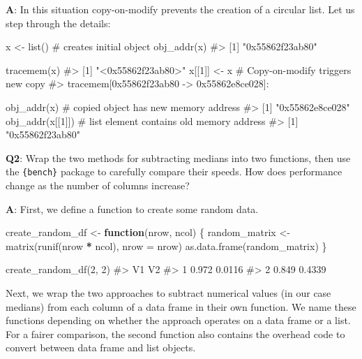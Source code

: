 \documentclass[
]{krantz}
\makeatletter
\newenvironment{Shaded}{\begin{snugshade}}{\end{snugshade}}
\newcommand{\CommentTok}[1]{\textcolor[rgb]{0.56,0.35,0.01}{\textit{#1}}}
\newcommand{\ControlFlowTok}[1]{\textcolor[rgb]{0.13,0.29,0.53}{\textbf{#1}}}
\newcommand{\DataTypeTok}[1]{\textcolor[rgb]{0.13,0.29,0.53}{#1}}
\newcommand{\DecValTok}[1]{\textcolor[rgb]{0.00,0.00,0.81}{#1}}
\newcommand{\KeywordTok}[1]{\textcolor[rgb]{0.13,0.29,0.53}{\textbf{#1}}}
\newcommand{\NormalTok}[1]{#1}
\newcommand{\OperatorTok}[1]{\textcolor[rgb]{0.81,0.36,0.00}{\textbf{#1}}}
\newcommand{\StringTok}[1]{\textcolor[rgb]{0.31,0.60,0.02}{#1}}
\newenvironment{kframe}{%
\medskip{}
\setlength{\fboxsep}{.8em}
 \def\at@end@of@kframe{}%
 \ifinner\ifhmode%
  \def\at@end@of@kframe{\end{minipage}}%
  \begin{minipage}{\columnwidth}%
 \fi\fi%
 \def\FrameCommand##1{\hskip\@totalleftmargin \hskip-\fboxsep
 \colorbox{shadecolor}{##1}\hskip-\fboxsep
     \hskip-\linewidth \hskip-\@totalleftmargin \hskip\columnwidth}%
 \MakeFramed {\advance\hsize-\width
   \@totalleftmargin\z@ \linewidth\hsize
   \@setminipage}}%
 {\par\unskip\endMakeFramed%
 \at@end@of@kframe}
\renewenvironment{Shaded}{\begin{kframe}}{\end{kframe}}
\renewcommand{\KeywordTok} [1]{\textcolor[rgb]{0.00,0.44,0.13}{{#1}}}
\renewcommand{\DataTypeTok}[1]{\textcolor[rgb]{0.56,0.13,0.00}{{#1}}}
\renewcommand{\DecValTok}  [1]{\textcolor[rgb]{0.25,0.63,0.44}{{#1}}}
\renewcommand{\StringTok}  [1]{\textcolor[rgb]{0.25,0.44,0.63}{{#1}}}
\renewcommand{\CommentTok} [1]{\textcolor[rgb]{0.38,0.63,0.69}{{#1}}}
\renewcommand{\NormalTok}  [1]{{#1}}
\makeatother
\begin{document}
\textbf{{A}}: In this situation copy-on-modify prevents the creation of a circular list. Let us step through the details:

\begin{Shaded}
\begin{Highlighting}[]
\NormalTok{x <-}\StringTok{ }\KeywordTok{list}\NormalTok{()  }\CommentTok{# creates initial object}
\KeywordTok{obj_addr}\NormalTok{(x)}
\CommentTok{#> [1] "0x55862f23ab80"}

\KeywordTok{tracemem}\NormalTok{(x)}
\CommentTok{#> [1] "<0x55862f23ab80>"}
\NormalTok{x[[}\DecValTok{1}\NormalTok{]] <-}\StringTok{ }\NormalTok{x  }\CommentTok{# Copy-on-modify triggers new copy}
\CommentTok{#> tracemem[0x55862f23ab80 -> 0x55862e8ce028]:}

\KeywordTok{obj_addr}\NormalTok{(x)       }\CommentTok{# copied object has new memory address}
\CommentTok{#> [1] "0x55862e8ce028"}
\KeywordTok{obj_addr}\NormalTok{(x[[}\DecValTok{1}\NormalTok{]])  }\CommentTok{# list element contains old memory address}
\CommentTok{#> [1] "0x55862f23ab80"}
\end{Highlighting}
\end{Shaded}

\textbf{{Q2}}: Wrap the two methods for subtracting medians into two functions, then use the \texttt{\{bench\}} package to carefully compare their speeds. How does performance change as the number of columns increase?

\textbf{{A}}: First, we define a function to create some random data.

\begin{Shaded}
\begin{Highlighting}[]
\NormalTok{create_random_df <-}\StringTok{ }\ControlFlowTok{function}\NormalTok{(nrow, ncol) \{}
\NormalTok{  random_matrix <-}\StringTok{ }\KeywordTok{matrix}\NormalTok{(}\KeywordTok{runif}\NormalTok{(nrow }\OperatorTok{*}\StringTok{ }\NormalTok{ncol), }\DataTypeTok{nrow =}\NormalTok{ nrow)}
  \KeywordTok{as.data.frame}\NormalTok{(random_matrix)}
\NormalTok{\}}

\KeywordTok{create_random_df}\NormalTok{(}\DecValTok{2}\NormalTok{, }\DecValTok{2}\NormalTok{)}
\CommentTok{#>      V1     V2}
\CommentTok{#> 1 0.972 0.0116}
\CommentTok{#> 2 0.849 0.4339}
\end{Highlighting}
\end{Shaded}

Next, we wrap the two approaches to subtract numerical values (in our case medians) from each column of a data frame in their own function. We name these functions depending on whether the approach operates on a data frame or a list. For a fairer comparison, the second function also contains the overhead code to convert between data frame and list objects.
\end{document}
